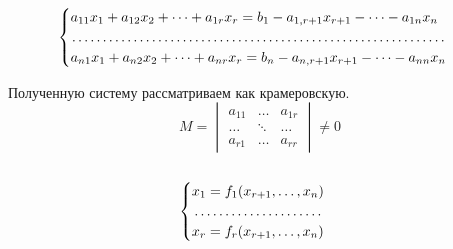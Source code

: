 \documentclass[a4paper, 12pt]{article}
\begin{document}
   $$ \begin{cases}
    a_{11}x_1+a_{12}x_2+ \dots + a_{1r}x_r = b_1-a_{1, r+1}x_{r+1}- \dots -a_{1n}x_n\\
    \dotfill\\
    a_{n1}x_1+a_{n2}x_2+ \dots + a_{nr}x_r = b_n-a_{n, r+1}x_{r+1}- \dots -a_{nn}x_n
    \end{cases}$$

Полученную систему рассматриваем как крамеровскую.\\
$$M=
\begin{vmatrix}
a_{11} & \dots & a_{1r}\\
\dots & \ddots & \dots\\
a_{r1} & \dots & a_{rr}
\end{vmatrix} \neq 0$$\\
\begin{equation*}
    \begin{cases}
    $$x_1=f_1(x_{r+1},\dots,x_n)$$\\
    \dotfill\\
    $$x_r=f_r(x_{r+1},\dots,x_n)$$
    \end{cases}
\end{equation*}
\end{document}

